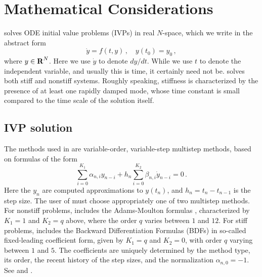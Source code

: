 \chapter{Mathematical Considerations}\label{s:math}

{\cvode} solves ODE initial value problems (IVPs) in real $N$-space, which we
write in the abstract form
\begin{equation}\label{e:ivp} 
  \dot{y} = f(t,y) \, ,\quad y(t_0) = y_0 \, ,
\end{equation}
where $y \in \mbox{\bf R}^N$.
Here we use $\dot{y}$ to denote $dy/dt$.  While we use $t$ to denote
the independent variable, and usually this is time, it certainly need
not be.  {\cvode} solves both stiff and nonstiff systems.  Roughly
speaking, stiffness is characterized by the presence of at least one
rapidly damped mode, whose time constant is small compared to the time
scale of the solution itself.

\section{IVP solution}\label{ss:ivp_sol}

The methods used in {\cvode} are variable-order, variable-step multistep
methods, based on formulas of the form
\begin{equation}\label{e:lmm}
 \sum_{i = 0}^{K_1} \alpha_{n,i} y_{n-i} + 
     h_n \sum_{i = 0}^{K_2} \beta_{n,i} \dot{y}_{n-i} = 0 \, .
\end{equation}
Here the $y_n$ are computed approximations to $y(t_n)$, and
$h_n = t_n - t_{n-1}$ is the step size.  The user of {\cvode} must choose
appropriately one of two multistep methods.  For nonstiff problems,
{\cvode} includes the Adams-Moulton formulas ,
characterized by $K_1 = 1$
and $K_2 = q$ above, where the order $q$ varies between $1$ and $12$.
For stiff problems, {\cvode} includes the Backward Differentiation
Formulas (BDFs)   
in so-called fixed-leading coefficient form, given by
$K_1 = q$ and $K_2 = 0$, with order $q$ varying between $1$ and $5$.
The coefficients are uniquely determined by the method type, its
order, the recent history of the step sizes, and the normalization
$\alpha_{n,0} = -1$.  See \cite{ByHi:75} and \cite{JaSD:80}.

